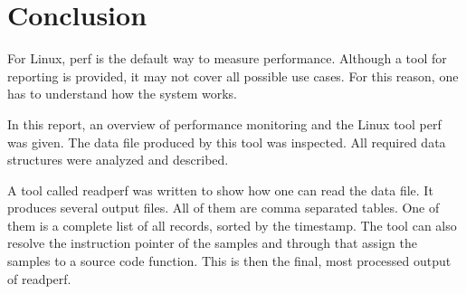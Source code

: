 \section{Conclusion}
For Linux, perf is the default way to measure performance. Although a tool for reporting is provided, it may not cover all possible use cases. For this reason, one has to understand how the system works.

In this report, an overview of performance monitoring and the Linux tool perf was given. The data file produced by this tool was inspected. All required data structures were analyzed and described.

A tool called readperf was written to show how one can read the data file. It produces several output files. All of them are comma separated tables. One of them is a complete list of all records, sorted by the timestamp. The tool can also resolve the instruction pointer of the samples and through that assign the samples to a source code function. This is then the final, most processed output of readperf.

